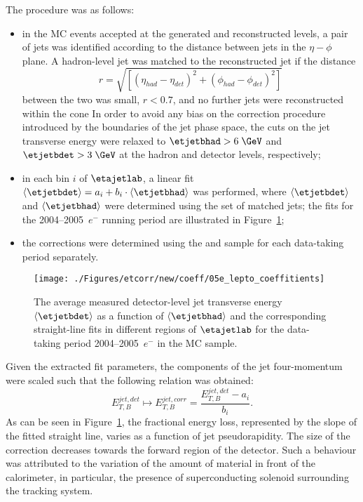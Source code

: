 The procedure was as follows:
\begin{itemize}
 \item in the MC events accepted at the generated and reconstructed levels, a pair of jets was identified according to the distance between jets in the $\eta-\phi$ plane. A hadron-level jet was matched to the reconstructed jet if the distance 
\begin{equation}
r=\sqrt{\left[\left(\eta_{had}-\eta_{det}\right)^2 + \left(\phi_{had}-\phi_{det}\right)^2\right]}
\end{equation}
between the two was small, $r<0.7$, and no further jets were reconstructed within the cone
In order to avoid any bias on the correction procedure introduced by the boundaries of the jet phase space, the cuts on the jet transverse energy were relaxed to $\etjetbhad>6\;\GeV$ and $\etjetbdet>3\;\GeV$ at the hadron and detector levels, respectively;
 \item in each bin $i$ of $\etajetlab$, a linear fit $\left\langle\etjetbdet\right\rangle = a_i + b_i\cdot\left\langle\etjetbhad\right\rangle$ was performed, where $\left\langle\etjetbdet\right\rangle$ and $\left\langle\etjetbhad\right\rangle$ were determined using the set of matched jets; the fits for the 2004--2005~$e^-$ running period are illustrated in Figure~\ref{fig:05e_lepto_coeffitients};
 \item the corrections were determined using the \ariadne and \lepto sample for each data-taking period separately. 
\end{itemize}
\begin{figure}[p]
\centering
\texttt{[image: ./Figures/etcorr/new/coeff/05e\_lepto\_coeffitients]}
\caption{The average measured detector-level jet transverse energy $\left\langle\etjetbdet\right\rangle$ as a function of $\left\langle\etjetbhad\right\rangle$ and the corresponding straight-line fits in different regions of $\etajetlab$ for the data-taking period 2004--2005~$e^-$ in the \lepto MC sample.}
\label{fig:05e_lepto_coeffitients}
\end{figure}

Given the extracted fit parameters, the components of the jet four-mo\-me\-ntum were scaled such that the following relation was obtained:
 \begin{equation}
  E_{T,B}^{jet,det} \mapsto E_{T,B}^{jet,corr} = \frac{E_{T,B}^{jet,det} - a_i}{b_i}.
 \end{equation}
As can be seen in Figure~\ref{fig:05e_lepto_coeffitients}, the fractional energy loss, represented by the slope of the fitted straight line, varies as a function of jet pseudorapidity. The size of the correction decreases towards the forward region of the detector. Such a behaviour was attributed to the variation of the amount of material in front of the calorimeter, in particular, the presence of superconducting solenoid surrounding the tracking system. 

